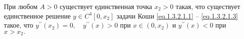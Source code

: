 \begin{lemma}\label{AbEI:lemm2} При любом $ A>0 $ существует единственная точка
$ x_2>0 $ такая, что существует единственное решение $ y \in C^4[0,x_2] $ задачи
Коши \eqref{eq.1.3.2.1.1} -- \eqref{eq.1.3.2.1.3} такое, что $ y^{\prime\prime}(x_2)=0,\quad y^{\prime\prime}(x)>0$
при $ x \in (0,x_2) $ и $ y^{\prime\prime}(x)<0 $  при $ x>x_2. $
\end{lemma}

%
%
%



